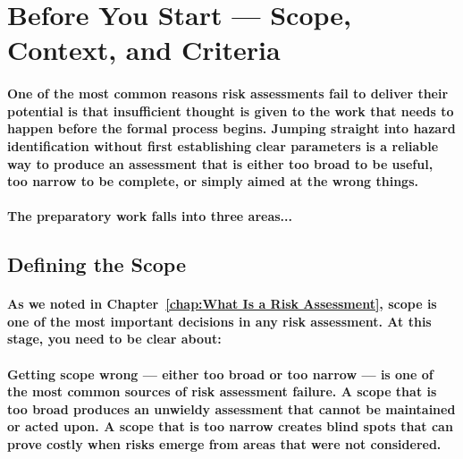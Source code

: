 \section{Before You Start — Scope, Context, and Criteria}
\paragraph{One of the most common reasons risk assessments fail to deliver their potential is that insufficient thought is given to the work that needs to happen before the formal process begins. Jumping straight into hazard identification without first establishing clear parameters is a reliable way to produce an assessment that is either too broad to be useful, too narrow to be complete, or simply aimed at the wrong things.}
\paragraph{The preparatory work falls into three areas...}

\subsection{Defining the Scope}
\paragraph{As we noted in Chapter~\ref{chap:What Is a Risk Assessment}, scope is one of the most important decisions in any risk assessment. At this stage, you need to be clear about:}
\begin{itemize}
\end{itemize}
\paragraph{Getting scope wrong — either too broad or too narrow — is one of the most common sources of risk assessment failure. A scope that is too broad produces an unwieldy assessment that cannot be maintained or acted upon. A scope that is too narrow creates blind spots that can prove costly when risks emerge from areas that were not considered.}

